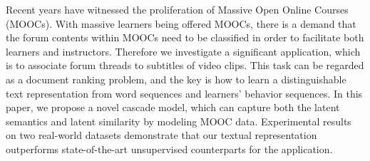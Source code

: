 Recent years have witnessed the proliferation of Massive Open Online Courses (MOOCs). With massive learners being offered MOOCs, there is a demand that the forum contents within MOOCs need to be classified in order to facilitate both learners and instructors. Therefore we investigate a significant application, which is to associate forum threads to subtitles of video clips. This task can be regarded as a document ranking problem, and the key is how to learn a distinguishable text representation from word sequences and learners' behavior sequences. In this paper, we propose a novel cascade model, which can capture both the latent semantics and latent similarity by modeling MOOC data. Experimental results on two real-world datasets demonstrate that our textual representation outperforms state-of-the-art unsupervised counterparts for the application.

